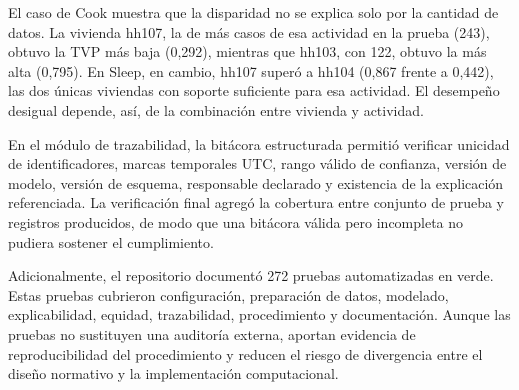El caso de Cook muestra que la disparidad no se explica solo por la cantidad de
datos. La vivienda hh107, la de más casos de esa actividad en la prueba (243),
obtuvo la TVP más baja (0,292), mientras que hh103, con 122, obtuvo la más alta
(0,795). En Sleep, en cambio, hh107 superó a hh104 (0,867 frente a 0,442), las
dos únicas viviendas con soporte suficiente para esa actividad. El desempeño
desigual depende, así, de la combinación entre vivienda y actividad.

En el módulo de trazabilidad, la bitácora estructurada permitió verificar
unicidad de identificadores, marcas temporales UTC, rango válido de confianza,
versión de modelo, versión de esquema, responsable declarado y existencia de la
explicación referenciada. La verificación final agregó la cobertura entre
conjunto de prueba y registros producidos, de modo que una bitácora válida pero
incompleta no pudiera sostener el cumplimiento.

Adicionalmente, el repositorio documentó 272 pruebas automatizadas en verde.
Estas pruebas cubrieron configuración, preparación de datos, modelado,
explicabilidad, equidad, trazabilidad, procedimiento y documentación. Aunque las
pruebas no sustituyen una auditoría externa, aportan evidencia de
reproducibilidad del procedimiento y reducen el riesgo de divergencia entre el
diseño normativo y la implementación computacional.
